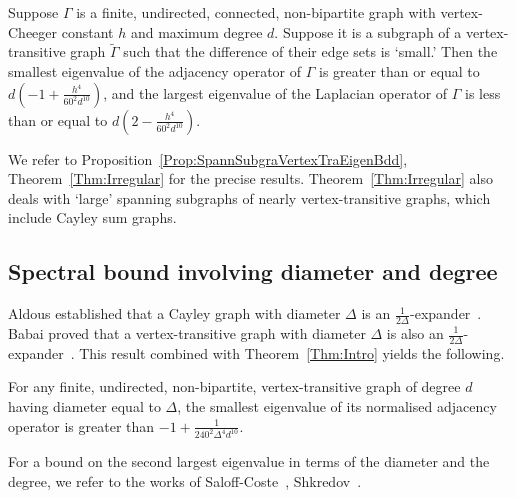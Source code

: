 \documentclass[ALCO,Unicode,published]{cedram}
\begin{document}
\begin{theorem}
\label{Thm:IntroIrr}
Suppose $\Gamma$ is a finite, undirected, connected, non-bipartite graph with vertex-Cheeger constant $h$ and maximum degree $d$. Suppose it is a subgraph of a vertex-transitive graph $\widetilde \Gamma$ such that the difference of their edge sets is `small.' Then the smallest eigenvalue of the adjacency operator of $\Gamma$ is greater than or equal to $ d \left(-1 + \frac{h^4 }{60^2 d^{10}}\right)$, and the largest eigenvalue of the Laplacian operator of $\Gamma$ is less than or equal to $d \left(2 -  \frac{h^4 }{60^2 d^{10}}\right)$. 
\end{theorem}

We refer to Proposition~\ref{Prop:SpannSubgraVertexTraEigenBdd}, Theorem~\ref{Thm:Irregular} for the precise results. Theorem~\ref{Thm:Irregular} also deals with `large' spanning subgraphs of nearly vertex-transitive graphs, which include Cayley sum graphs. 

\subsection{Spectral bound involving diameter and degree}

Aldous established that a Cayley graph with diameter $\Delta$ is an $\frac 1{2\Delta}$-expander~\cite[Lemma 3.1]{AldousMarkovChainSimulation}. Babai proved that a vertex-transitive graph with diameter $\Delta$ is also an $\frac 1 {2\Delta}$-expander~\cite[Proposition 3.5]{BabaiLocalExpansionVertexTransitive}. This result combined with Theorem~\ref{Thm:Intro} yields the following. 

\begin{theorem}
\label{Thm:IntroDiam}
For any finite, undirected, non-bipartite, vertex-transitive graph of degree $d$ having diameter equal to $\Delta$, the smallest eigenvalue of its normalised adjacency operator is greater than $-1 + \frac{1}{240^2 \Delta^4 d^{10}}$.
\end{theorem}

For a bound on the second largest eigenvalue in terms of the diameter and the degree, we refer to the works of Saloff-Coste~\cite[Corollary 3.2.7]{SaloffCosteLectureFiniteMarkovChain}, Shkredov~\cite{ShkredovSpectralGapDiamCayley}.
\end{document}

